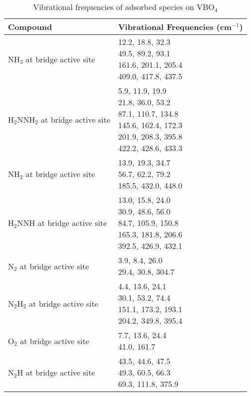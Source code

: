 \clearpage
\begin{center}
\renewcommand*{\arraystretch}{2}
\begin{longtable}{|m{6cm} |m{6cm} |} 
\caption{Vibrational frequencies of adsorbed species on VBO$_4$}
\label{tab:energies}
\endfirsthead
\endhead
\hline
Compound & Vibrational Frequencies (cm$^{-1}$) \\ 
\hline 
NH$_{3}$ at bridge active site&\parbox[t]{6cm}{12.2, 18.8, 32.3\\49.5, 89.2, 93.1\\161.6, 201.1, 205.4\\409.0, 417.8, 437.5}\\ \hline 
 H$_{2}$NNH$_{2}$ at bridge active site&\parbox[t]{6cm}{5.9, 11.9, 19.9\\21.8, 36.0, 53.2\\87.1, 110.7, 134.8\\145.6, 162.4, 172.3\\201.9, 208.3, 395.8\\422.2, 428.6, 433.3}\\ \hline 
 NH$_{2}$ at bridge active site&\parbox[t]{6cm}{13.9, 19.3, 34.7\\56.7, 62.2, 79.2\\185.5, 432.0, 448.0}\\ \hline 
 H$_{2}$NNH at bridge active site&\parbox[t]{6cm}{13.0, 15.8, 24.0\\30.9, 48.6, 56.0\\84.7, 105.9, 150.8\\165.3, 181.8, 206.6\\392.5, 426.9, 432.1}\\ \hline 
 N$_{2}$ at bridge active site&\parbox[t]{6cm}{3.9, 8.4, 26.0\\29.4, 30.8, 304.7}\\ \hline 
 N$_{2}$H$_{2}$ at bridge active site&\parbox[t]{6cm}{4.4, 13.6, 24.1\\30.1, 53.2, 74.4\\151.1, 173.2, 193.1\\204.2, 349.8, 395.4}\\ \hline 
 O$_{2}$ at bridge active site&\parbox[t]{6cm}{7.7, 13.6, 24.4\\41.0, 161.7}\\ \hline 
 N$_{2}$H at bridge active site&\parbox[t]{6cm}{43.5, 44.6, 47.5\\49.3, 60.5, 66.3\\69.3, 111.8, 375.9}\\ \hline 
  \end{longtable}
\end{center}
